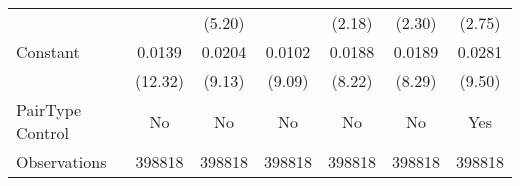 {\begin{tabular}{l*{6}{c}}
                    &                     &      (5.20)         &                     &      (2.18)         &      (2.30)         &      (2.75)         \\
[1em]
Constant            &      0.0139\sym{***}&      0.0204\sym{***}&      0.0102\sym{***}&      0.0188\sym{***}&      0.0189\sym{***}&      0.0281\sym{***}\\
                    &     (12.32)         &      (9.13)         &      (9.09)         &      (8.22)         &      (8.29)         &      (9.50)         \\
\hline
PairType Control    &          No         &          No         &          No         &          No         &          No         &         Yes         \\
Observations        &      398818         &      398818         &      398818         &      398818         &      398818         &      398818         \\
\hline\hline  \end{tabular}}
